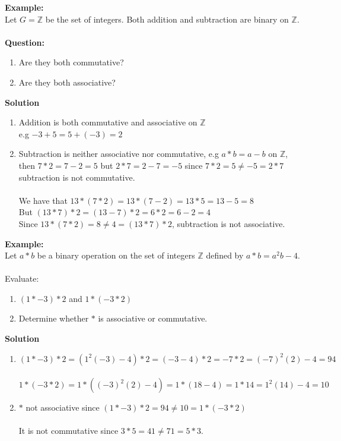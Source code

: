 \documentclass[11pt,a4paper]{article}
\begin{document}
\textbf{Example:}\\ Let $G=\mathbb{Z}$ be the set of integers. Both addition and subtraction are binary on $\mathbb{Z}$.\\\\
\textbf{Question:}
\begin{enumerate}
                 \item[(1).] Are they both commutative?
                 \item[(2).] Are they both associative?\\
\end{enumerate}


\textbf{Solution}
\begin{enumerate}
\item Addition is both commutative and associative on $\mathbb{Z}$\\ e.g $-3+5=5+(-3)=2$
\item Subtraction is neither associative nor commutative, e.g $a*b=a-b$ on $\mathbb{Z}$,\\ then $7*2=7-2=5$ but $2*7=2-7=-5$ since $7*2=5\neq -5=2*7$ subtraction is not commutative.\\\\
We have that  
$13*(7*2) = 13*(7-2)=13*5=13-5=8$\\
But  $(13*7)*2=(13-7)*2=6*2=6-2=4$\\
Since $13*(7*2)=8\neq 4 =(13*7)*2$, subtraction is not associative.\\
\end{enumerate}

\textbf{Example:}\\
Let $a*b$ be a binary operation on the  set of integers $\mathbb{Z}$ defined by $a*b=a^2b-4$.\\\\
Evaluate:
\begin{enumerate}
\item[(i).] $(1*-3)*2$ and $1*(-3*2)$
\item[(ii).] Determine whether $*$ is associative or commutative.\\
\end{enumerate}


\textbf{Solution}
\begin{enumerate}
\item[(i).] $(1*-3)*2=(1^2(-3)-4)*2=(-3-4)*2=-7*2=(-7)^2(2)-4=94$\\\\
$1*(-3*2)=1*((-3)^2(2)-4)=1*(18-4)=1*14=1^2(14)-4=10$\\

\item[(ii).] $*$ not associative since $(1*-3)*2=94\neq 10 =1*(-3*2)$\\\\
It is not commutative since $3*5=41\neq 71 =5*3$.\\
\end{enumerate}
\end{document}
